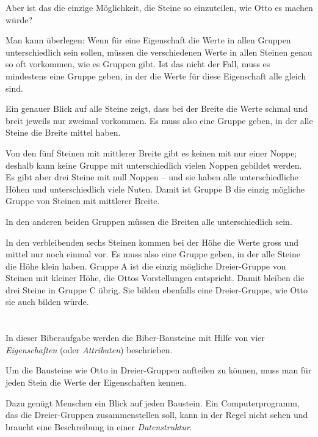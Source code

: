 {{{\par}

Aber ist das die einzige Möglichkeit, die Steine so einzuteilen, wie Otto es machen würde?

Man kann überlegen:  Wenn für eine Eigenschaft die Werte in allen Gruppen unterschiedlich sein sollen, müssen die verschiedenen Werte in allen Steinen genau so oft vorkommen, wie es Gruppen gibt. Ist das nicht der Fall, muss es mindestens eine Gruppe geben, in der die Werte für diese Eigenschaft alle gleich sind.

Ein genauer Blick auf alle Steine zeigt, dass bei der Breite die Werte schmal und breit jeweils nur zweimal vorkommen. Es muss also eine Gruppe geben, in der alle Steine die Breite mittel haben.

Von den fünf Steinen mit mittlerer Breite gibt es keinen mit nur einer Noppe; deshalb kann keine Gruppe mit unterschiedlich vielen Noppen gebildet werden. Es gibt aber drei Steine mit null Noppen – und sie haben alle unterschiedliche Höhen und unterschiedlich viele Nuten. Damit ist Gruppe B die einzig mögliche Gruppe von Steinen mit mittlerer Breite.

In den anderen beiden Gruppen müssen die Breiten alle unterschiedlich sein.

In den verbleibenden sechs Steinen kommen bei der Höhe die Werte gross und mittel nur noch einmal vor. Es muss also eine Gruppe geben, in der alle Steine die Höhe klein haben. Gruppe A ist die einzig mögliche Dreier-Gruppe von Steinen mit kleiner Höhe, die Ottos Vorstellungen entspricht. Damit bleiben die drei Steine in Gruppe C übrig. Sie bilden ebenfalls eine Dreier-Gruppe, wie Otto sie auch bilden würde.



\section*{\BrochureItsInformatics}
In dieser Biberaufgabe werden die Biber-Bausteine mit Hilfe von vier \emph{Eigenschaften} (oder \emph{Attributen}) beschrieben.

Um die Bausteine wie Otto in Dreier-Gruppen aufteilen zu können, muss man für jeden Stein die Werte der Eigenschaften kennen.

Dazu genügt Menschen ein Blick auf jeden Baustein. Ein Computerprogramm, das die Dreier-Gruppen zusammenstellen soll, kann in der Regel nicht sehen und braucht eine Beschreibung in einer \emph{Datenstruktur}.

}}
